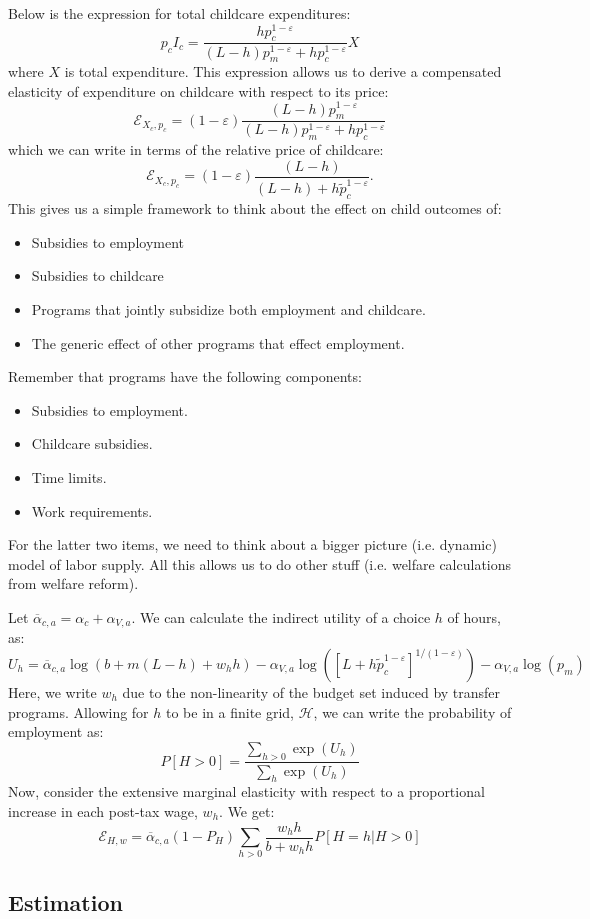 \documentclass[12pt]{article}
\newcommand\ov{\overline}
\newcommand\mc{\mathcal}
\numberwithin{equation}{section}
\numberwithin{figure}{section}
\numberwithin{table}{section}
\begin{document}
Below is the expression for total childcare expenditures:
\[p_cI_c = \frac{h p_c^{1-\varepsilon}}{(L-h)p_m^{1-\varepsilon} + hp_c^{1-\varepsilon}} X \]
where $X$ is total expenditure. This expression allows us to derive a compensated elasticity of expenditure on childcare with respect to its price:
\[\mathcal{E}_{X_c,p_c} = (1-\varepsilon)\frac{(L-h)p_m^{1-\varepsilon}}{(L-h)p_m^{1-\varepsilon} + hp_c^{1-\varepsilon}} \]
which we can write in terms of the relative price of childcare:
\[\mathcal{E}_{X_c,p_c} = (1-\varepsilon)\frac{(L-h)}{(L-h) + h\tilde{p}_c^{1-\varepsilon}}.\]
This gives us a simple framework to think about the effect on child outcomes of:
\begin{itemize}
\item Subsidies to employment
\item Subsidies to childcare
\item Programs that jointly subsidize both employment and childcare.
\item The generic effect of other programs that effect employment.
\end{itemize}
Remember that programs have the following components:
\begin{itemize}
\item Subsidies to employment.
\item Childcare subsidies.
\item Time limits.
\item Work requirements.
\end{itemize}
For the latter two items, we need to think about a bigger picture (i.e. dynamic) model of labor supply. All this allows us to do other stuff (i.e. welfare calculations from welfare reform).

Let $\ov{\alpha}_{c,a} = \alpha_c + \alpha_{V,a}$. We can calculate the indirect utility of a choice $h$ of hours, as:
\[ U_h = \ov{\alpha}_{c,a}\log(b+m(L-h)+w_hh) - \alpha_{V,a}\log\left([L + h\tilde{p}_c^{1-\varepsilon}]^{1/(1-\varepsilon)}\right) - \alpha_{V,a}\log(p_m) \]
Here, we write $w_h$ due to the non-linearity of the budget set induced by transfer programs. Allowing for $h$ to be in a finite grid, $\mc{H}$, we can write the probability of employment as:
\[P[H>0] = \frac{\sum_{h>0}\exp(U_h)}{\sum_h\exp(U_h)} \]
Now, consider the extensive marginal elasticity with respect to a proportional increase in each post-tax wage, $w_h$. We get:
\[\mathcal{E}_{H,w}  = \ov{\alpha}_{c,a}(1-P_H)\sum_{h>0}\frac{w_hh}{b+w_hh}P[H=h|H>0] \]

\subsection{Estimation}
\end{document}
